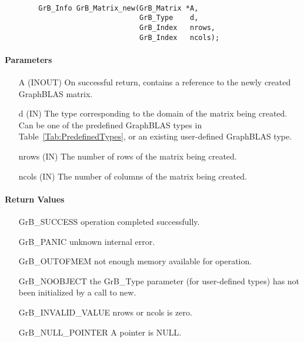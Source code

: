 \paragraph{\syntax}

\begin{verbatim}
        GrB_Info GrB_Matrix_new(GrB_Matrix *A,
                                GrB_Type    d,
                                GrB_Index   nrows,
                                GrB_Index   ncols);
\end{verbatim}

\paragraph{Parameters}

\begin{itemize}[leftmargin=1.1in]
    \item[{\sf A}] ({\sf INOUT}) On successful return, contains a reference to 
                                 the newly created GraphBLAS matrix.
    \item[{\sf d}] ({\sf IN})    The type corresponding to the domain of the matrix 
                                 being created. Can be one of the predefined
                                 GraphBLAS types in Table~\ref{Tab:PredefinedTypes}, 
                                 or an existing user-defined GraphBLAS type.
    \item[{\sf nrows}] ({\sf IN}) The number of rows of the matrix being created.
    \item[{\sf ncols}] ({\sf IN}) The number of columns of the matrix being created.
\end{itemize}


\paragraph{Return Values}

\begin{itemize}[leftmargin=2.1in]
\item[{\sf GrB\_SUCCESS}]   operation completed successfully.
\item[{\sf GrB\_PANIC}]     unknown internal error.
\item[{\sf GrB\_OUTOFMEM}]  not enough memory available for operation.
\item[{\sf GrB\_NOOBJECT}]   the {\sf GrB\_Type} parameter (for user-defined
                             types) has not been initialized by a
                             call to {\sf new}.
\item[{\sf GrB\_INVALID\_VALUE}]    {\sf nrows} or {\sf ncols} is zero.
\item[{\sf GrB\_NULL\_POINTER}]    {\sf A} pointer is {\sf NULL}.
\end{itemize}

